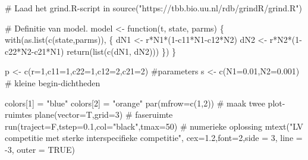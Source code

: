 \documentclass[
  a4paper,
]{scrbook}
\newenvironment{Shaded}{\begin{snugshade}}{\end{snugshade}}
\newcommand{\AttributeTok}[1]{\textcolor[rgb]{0.40,0.45,0.13}{#1}}
\newcommand{\CommentTok}[1]{\textcolor[rgb]{0.37,0.37,0.37}{#1}}
\newcommand{\ConstantTok}[1]{\textcolor[rgb]{0.56,0.35,0.01}{#1}}
\newcommand{\ControlFlowTok}[1]{\textcolor[rgb]{0.00,0.23,0.31}{#1}}
\newcommand{\DecValTok}[1]{\textcolor[rgb]{0.68,0.00,0.00}{#1}}
\newcommand{\FloatTok}[1]{\textcolor[rgb]{0.68,0.00,0.00}{#1}}
\newcommand{\FunctionTok}[1]{\textcolor[rgb]{0.28,0.35,0.67}{#1}}
\newcommand{\NormalTok}[1]{\textcolor[rgb]{0.00,0.23,0.31}{#1}}
\newcommand{\OtherTok}[1]{\textcolor[rgb]{0.00,0.23,0.31}{#1}}
\newcommand{\SpecialCharTok}[1]{\textcolor[rgb]{0.37,0.37,0.37}{#1}}
\newcommand{\StringTok}[1]{\textcolor[rgb]{0.13,0.47,0.30}{#1}}
\theoremstyle{definition}
\theoremstyle{remark}
\begin{document}
\begin{Shaded}
\begin{Highlighting}[]
\CommentTok{\# Laad het grind.R{-}script in}
\FunctionTok{source}\NormalTok{(}\StringTok{"https://tbb.bio.uu.nl/rdb/grindR/grind.R"}\NormalTok{)}

\CommentTok{\# Definitie van model. }
\NormalTok{model }\OtherTok{\textless{}{-}} \ControlFlowTok{function}\NormalTok{(t, state, parms) \{}
  \FunctionTok{with}\NormalTok{(}\FunctionTok{as.list}\NormalTok{(}\FunctionTok{c}\NormalTok{(state,parms)), \{}
\NormalTok{    dN1 }\OtherTok{\textless{}{-}}\NormalTok{ r}\SpecialCharTok{*}\NormalTok{N1}\SpecialCharTok{*}\NormalTok{(}\DecValTok{1}\SpecialCharTok{{-}}\NormalTok{c11}\SpecialCharTok{*}\NormalTok{N1}\SpecialCharTok{{-}}\NormalTok{c12}\SpecialCharTok{*}\NormalTok{N2)}
\NormalTok{    dN2 }\OtherTok{\textless{}{-}}\NormalTok{ r}\SpecialCharTok{*}\NormalTok{N2}\SpecialCharTok{*}\NormalTok{(}\DecValTok{1}\SpecialCharTok{{-}}\NormalTok{c22}\SpecialCharTok{*}\NormalTok{N2}\SpecialCharTok{{-}}\NormalTok{c21}\SpecialCharTok{*}\NormalTok{N1)}
    \FunctionTok{return}\NormalTok{(}\FunctionTok{list}\NormalTok{(}\FunctionTok{c}\NormalTok{(dN1, dN2)))  }
\NormalTok{  \}) }
\NormalTok{\}  }


\NormalTok{p }\OtherTok{\textless{}{-}} \FunctionTok{c}\NormalTok{(}\AttributeTok{r=}\DecValTok{1}\NormalTok{,}\AttributeTok{c11=}\DecValTok{1}\NormalTok{,}\AttributeTok{c22=}\DecValTok{1}\NormalTok{,}\AttributeTok{c12=}\DecValTok{2}\NormalTok{,}\AttributeTok{c21=}\DecValTok{2}\NormalTok{)  }\CommentTok{\#parameters}
\NormalTok{s }\OtherTok{\textless{}{-}} \FunctionTok{c}\NormalTok{(}\AttributeTok{N1=}\FloatTok{0.01}\NormalTok{,}\AttributeTok{N2=}\FloatTok{0.001}\NormalTok{) }\CommentTok{\# kleine begin{-}dichtheden}

\NormalTok{colors[}\DecValTok{1}\NormalTok{] }\OtherTok{=} \StringTok{"blue"}
\NormalTok{colors[}\DecValTok{2}\NormalTok{] }\OtherTok{=} \StringTok{"orange"}
\FunctionTok{par}\NormalTok{(}\AttributeTok{mfrow=}\FunctionTok{c}\NormalTok{(}\DecValTok{1}\NormalTok{,}\DecValTok{2}\NormalTok{)) }\CommentTok{\# maak twee plot{-}ruimtes}
\FunctionTok{plane}\NormalTok{(}\AttributeTok{vector=}\NormalTok{T,}\AttributeTok{grid=}\DecValTok{3}\NormalTok{) }\CommentTok{\# faseruimte }
\FunctionTok{run}\NormalTok{(}\AttributeTok{traject=}\NormalTok{F,}\AttributeTok{tstep=}\FloatTok{0.1}\NormalTok{,}\AttributeTok{col=}\StringTok{"black"}\NormalTok{,}\AttributeTok{tmax=}\DecValTok{50}\NormalTok{) }\CommentTok{\# numerieke oplossing}
\FunctionTok{mtext}\NormalTok{(}\StringTok{"LV competitie met sterke interspecifieke competitie"}\NormalTok{, }\AttributeTok{cex=}\FloatTok{1.2}\NormalTok{,}\AttributeTok{font=}\DecValTok{2}\NormalTok{,}\AttributeTok{side =} \DecValTok{3}\NormalTok{, }\AttributeTok{line =} \SpecialCharTok{{-}}\DecValTok{3}\NormalTok{, }\AttributeTok{outer =} \ConstantTok{TRUE}\NormalTok{)}
\end{Highlighting}
\end{Shaded}
\end{document}
